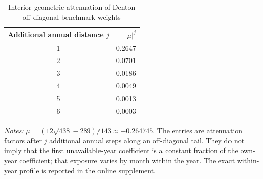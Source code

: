 \begin{table}[htbp]
\centering
\caption{Interior geometric attenuation of Denton off-diagonal benchmark weights}
\label{tab:denton_decay}
\begin{tabular}{cr}
\toprule
Additional annual distance $j$ & $|\mu|^j$ \\
\midrule
1 & 0.2647 \\
2 & 0.0701 \\
3 & 0.0186 \\
4 & 0.0049 \\
5 & 0.0013 \\
6 & 0.0003 \\
\bottomrule
\end{tabular}
\begin{singlespace}\footnotesize\textit{Notes:} $\mu=(12\sqrt{438}-289)/143\approx-0.264745$. The entries are attenuation factors after $j$ additional annual steps along an off-diagonal tail. They do not imply that the first unavailable-year coefficient is a constant fraction of the own-year coefficient; that exposure varies by month within the year. The exact within-year profile is reported in the online supplement.\end{singlespace}
\end{table}
